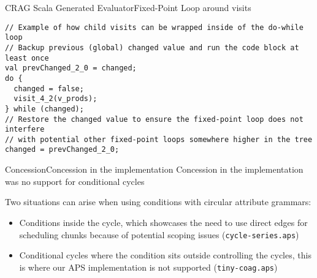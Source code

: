\begin{frame}[fragile=singleslide]{CRAG Scala Generated Evaluator}{Fixed-Point Loop around visits}
\begin{Verbatim}[fontsize=\scriptsize]
// Example of how child visits can be wrapped inside of the do-while loop
// Backup previous (global) changed value and run the code block at least once
val prevChanged_2_0 = changed;
do {
  changed = false;
  visit_4_2(v_prods);
} while (changed);
// Restore the changed value to ensure the fixed-point loop does not interfere
// with potential other fixed-point loops somewhere higher in the tree
changed = prevChanged_2_0;
\end{Verbatim}
\end{frame}


\begin{frame}{Concession}{Concession in the implementation}
    \alert{Concession} in the implementation was \alert{no support for conditional cycles}

    \newlinevspace 
    Two situations can arise when using conditions with circular attribute grammars:
    
    \begin{itemize}
        \item[] \cmark \; \alert{Conditions inside the cycle}, which showcases the need to use direct edges for scheduling chunks because of potential scoping issues (\texttt{cycle-series.aps})
        \item[] \xmark \; Conditional cycles where the \alert{condition sits outside controlling the cycles}, this is where our APS implementation is not supported (\texttt{tiny-coag.aps})
    \end{itemize}
\end{frame}

